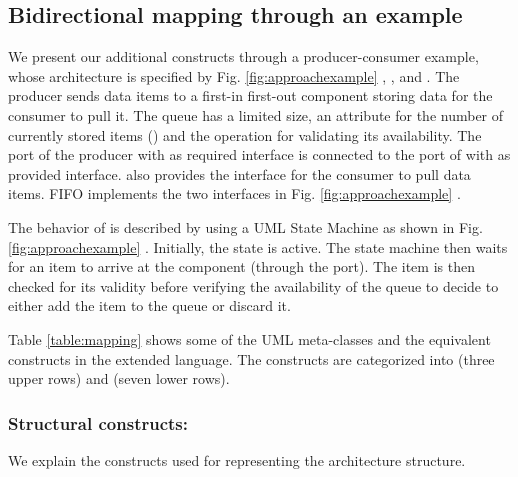 \subsection{Bidirectional mapping through an example}
\label{subsec:bimapping}
We present our additional constructs through a producer-consumer example, whose architecture is specified by Fig. \ref{fig:approachexample} , , and .
The  producer sends data items to a first-in first-out component  storing data for the consumer to pull it.
The  queue has a limited size, an attribute for the number of currently stored items () and the  operation for validating its availability.
The  port of the producer with  as required interface is connected to the  port of  with  as provided interface. %
 also provides the  interface for the consumer to pull data items.
FIFO implements the two interfaces in Fig. \ref{fig:approachexample} .

The behavior of  is described by using a UML State Machine as shown in Fig. \ref{fig:approachexample} .
Initially, the  state is active.
The state machine then waits for an item to arrive at the  component (through the  port).
The item is then checked for its validity before verifying the availability of the queue to decide to either add the item to the queue or discard it.

Table \ref{table:mapping} shows some of the UML meta-classes and the equivalent constructs in the extended language.
The constructs are categorized into  (three upper rows) and  (seven lower rows).



\subsubsection{Structural constructs:}
We explain the constructs used for representing the architecture structure.



